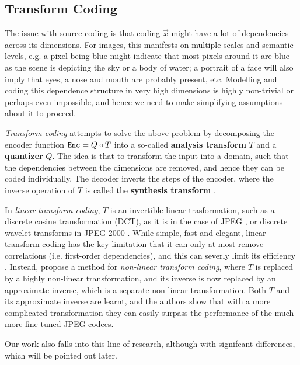 \subsection{Transform Coding}
The issue with source coding is that coding $\vec{x}$ might have a lot of
dependencies across its dimensions. For images, this manifests on multiple
scales and semantic levels, e.g. a pixel being blue might indicate that most
pixels around it are blue as the scene is depicting the sky or a body of water;
a portrait of a face will also imply that eyes, a nose and mouth are probably
present, etc. Modelling and coding this dependence structure in very high
dimensions is highly non-trivial or perhaps even impossible, and hence we need
to make simplifying assumptions about it to proceed.
\par
\textit{Transform coding} attempts to solve the above problem by decomposing the
encoder function $\mathtt{Enc} = Q \circ T$ into a so-called \textbf{analysis transform}
$T$ and a \textbf{quantizer} $Q$. The idea is that to transform the input into a
domain, such that the dependencies between the dimensions are removed, and hence
they can be coded individually. The decoder inverts the steps of the encoder,
where the inverse operation of $T$ is called the \textbf{synthesis transform}
\cite{gupta2011modified}.
\par
In \textit{linear transform coding}, $T$ is an invertible linear trasformation,
such as a discrete cosine transformation (DCT), as it is in the case of JPEG
\cite{wallace1992jpeg}, or discrete wavelet transforms in JPEG 2000
\cite{rabbani2002overview}. While simple, fast and elegant, linear transform
coding has the key limitation that it can only at most remove correlations (i.e.
first-order dependencies), and this can severly limit its efficiency
\cite{balle2016endtrans}. Instead, \cite{balle2016endtrans} propose a method for
\textit{non-linear transform coding}, where $T$ is replaced by a highly
non-linear transformation, and its inverse is now replaced by an approximate
inverse, which is a separate non-linear transformation. Both $T$ and its
approximate inverse are learnt, and the authors show that with a more
complicated transformation they can easily surpass the performance of the much
more fine-tuned JPEG codecs.
\par
Our work also falls into this line of research, although with signifcant
differences, which will be pointed out later.

